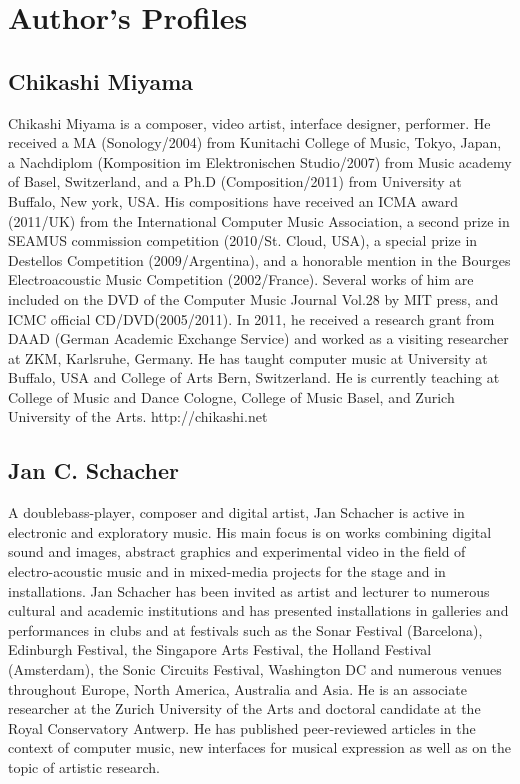 \documentclass[a4paper]{article}
\begin{document}
\printbibliography


\section{Author's Profiles}
\balance %

\subsection*{Chikashi Miyama}
Chikashi Miyama is a composer, video artist, interface designer, performer. He received a MA (Sonology/2004) from Kunitachi College of Music, Tokyo, Japan, a Nachdiplom (Komposition im Elektronischen Studio/2007) from Music academy of Basel, Switzerland, and a Ph.D (Composition/2011) from University at Buffalo, New york, USA. His compositions have received an ICMA award (2011/UK) from the International Computer Music Association, a second prize in SEAMUS commission competition (2010/St. Cloud, USA), a special prize in Destellos Competition (2009/Argentina), and a honorable mention in the Bourges Electroacoustic Music Competition (2002/France). Several works of him are included on the DVD of the Computer Music Journal Vol.28 by MIT press, and ICMC official CD/DVD(2005/2011). In 2011, he received a research grant from DAAD (German Academic Exchange Service) and worked as a visiting researcher at ZKM, Karlsruhe, Germany. He has taught computer music at University at Buffalo, USA and College of Arts Bern, Switzerland. He is currently teaching at College of Music and Dance Cologne, College of Music Basel, and Zurich University of the Arts. http://chikashi.net

\subsection*{Jan C. Schacher}
A doublebass-player, composer and digital artist, Jan Schacher is active in electronic and exploratory music. His main focus is on works combining digital sound and images, abstract graphics and experimental video in the field of electro-acoustic music and in mixed-media projects for the stage and in installations. Jan Schacher has been invited as artist and lecturer to numerous cultural and academic institutions and has presented installations in galleries and performances in clubs and at festivals such as the Sonar Festival (Barcelona), Edinburgh Festival, the Singapore Arts Festival, the Holland Festival (Amsterdam), the Sonic Circuits Festival, Washington DC and numerous venues throughout Europe, North America, Australia and Asia. He is an associate researcher at the Zurich University of the Arts and doctoral candidate at the Royal Conservatory Antwerp.
He has published peer-reviewed articles in the context of computer music, new interfaces for musical expression as well as on the topic of artistic research.
\end{document}
